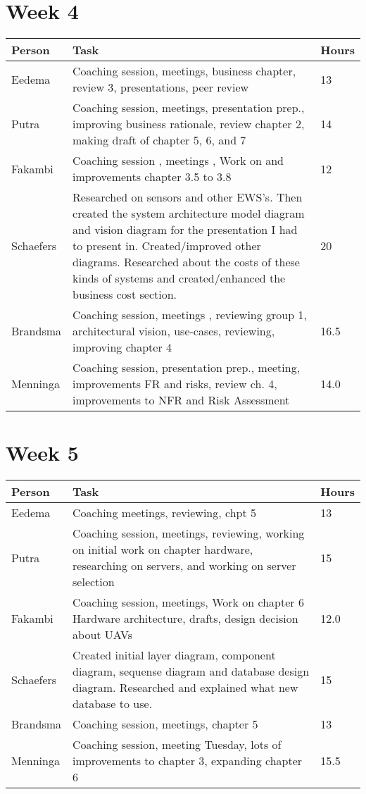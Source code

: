 \section{Week 4}
\begin{tabular}{p{} p{} p{}}
   \textbf{Person} & \textbf{Task} & \textbf{Hours} \\ \midrule
	Eedema & Coaching session, meetings, business chapter, review 3, presentations, peer review &13  \\ \midrule
	Putra & Coaching session, meetings, presentation prep., improving business rationale, review chapter 2, making draft of chapter 5, 6, and 7 & 14 \\ \midrule
	Fakambi & Coaching session , meetings , Work on and improvements chapter 3.5 to 3.8 & 12 \\ \midrule
	Schaefers & Researched on sensors and other EWS's. Then created the system architecture model diagram and vision diagram for the presentation I had to present in. Created/improved other diagrams. Researched about the costs of these kinds of systems and created/enhanced the business cost section. & 20 \\ \midrule
	Brandsma & Coaching session, meetings , reviewing group 1, architectural vision, use-cases, reviewing, improving chapter 4 & 16.5\\ \midrule
	Menninga & Coaching session, presentation prep., meeting, improvements FR and risks, review ch. 4, improvements to NFR and Risk Assessment & 14.0 \\ \midrule
\end{tabular}

\section{Week 5}
\begin{tabular}{p{} p{} p{}}
    \textbf{Person} & \textbf{Task} & \textbf{Hours} \\ \midrule
	Eedema & Coaching meetings, reviewing, chpt 5  & 13 \\ \midrule
	Putra & Coaching session, meetings, reviewing, working on initial work on chapter hardware, researching on servers, and working on server selection  & 15 \\ \midrule
	Fakambi & Coaching session, meetings, Work on chapter 6 Hardware architecture, drafts, design decision about UAVs & 12.0 \\ \midrule
	Schaefers & Created initial layer diagram, component diagram, sequense diagram and database design diagram. Researched and explained what new database to use.  & 15\\ \midrule
	Brandsma & Coaching session, meetings, chapter 5  & 13 \\ \midrule
	Menninga & Coaching session, meeting Tuesday, lots of improvements to chapter 3, expanding chapter 6 & 15.5 \\ \midrule
\end{tabular}

